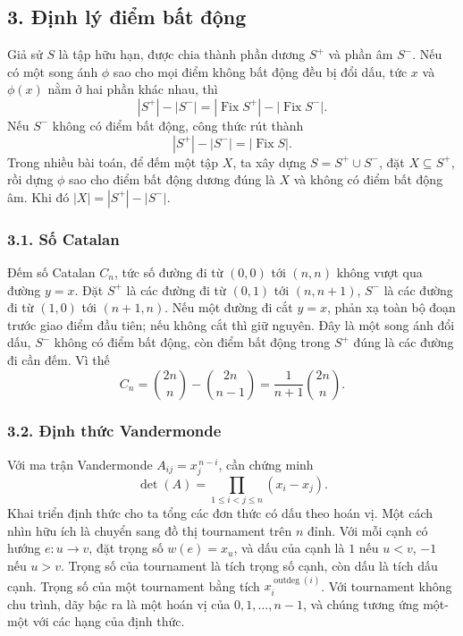 \documentclass[11pt]{article}
\begin{document}
\subsection*{3. Định lý điểm bất động}

Giả sử \(S\) là tập hữu hạn, được chia thành phần dương \(S^+\) và phần âm
\(S^-\). Nếu có một song ánh \(\phi\) sao cho mọi điểm không bất động đều bị
đổi dấu, tức \(x\) và \(\phi(x)\) nằm ở hai phần khác nhau, thì
\[
|S^+|-|S^-|=|\operatorname{Fix}S^+|-|\operatorname{Fix}S^-|.
\]
Nếu \(S^-\) không có điểm bất động, công thức rút thành
\[
|S^+|-|S^-|=|\operatorname{Fix}S|.
\]
Trong nhiều bài toán, để đếm một tập \(X\), ta xây dựng
\(S=S^+\cup S^-\), đặt \(X\subseteq S^+\), rồi dựng \(\phi\) sao cho điểm bất
động dương đúng là \(X\) và không có điểm bất động âm. Khi đó
\(|X|=|S^+|-|S^-|\).

\subsubsection*{3.1. Số Catalan}

Đếm số Catalan \(C_n\), tức số đường đi từ \((0,0)\) tới \((n,n)\) không vượt
qua đường \(y=x\). Đặt \(S^+\) là các đường đi từ \((0,1)\) tới \((n,n+1)\),
\(S^-\) là các đường đi từ \((1,0)\) tới \((n+1,n)\). Nếu một đường đi cắt
\(y=x\), phản xạ toàn bộ đoạn trước giao điểm đầu tiên; nếu không cắt thì giữ
nguyên. Đây là một song ánh đổi dấu, \(S^-\) không có điểm bất động, còn điểm
bất động trong \(S^+\) đúng là các đường đi cần đếm. Vì thế
\[
C_n=\binom{2n}{n}-\binom{2n}{n-1}
=\frac1{n+1}\binom{2n}{n}.
\]

\subsubsection*{3.2. Định thức Vandermonde}

Với ma trận Vandermonde \(A_{ij}=x_j^{\,n-i}\), cần chứng minh
\[
\det(A)=\prod_{1\le i<j\le n}(x_i-x_j).
\]
Khai triển định thức cho ta tổng các đơn thức có dấu theo hoán vị. Một cách
nhìn hữu ích là chuyển sang đồ thị tournament trên \(n\) đỉnh. Với mỗi cạnh
có hướng \(e:u\to v\), đặt trọng số \(w(e)=x_u\), và dấu của cạnh là \(1\)
nếu \(u<v\), \(-1\) nếu \(u>v\). Trọng số của tournament là tích trọng số
cạnh, còn dấu là tích dấu cạnh. Trọng số của một tournament bằng tích
\(x_i^{\operatorname{outdeg}(i)}\). Với tournament không chu trình, dãy bậc ra
là một hoán vị của \(0,1,\ldots,n-1\), và chúng tương ứng một-một với các hạng
của định thức.
\end{document}
